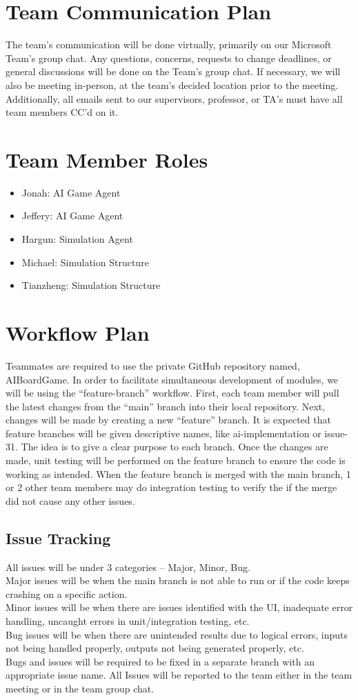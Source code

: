 \documentclass{article}
\begin{document}
\section{Team Communication Plan}
The team’s communication will be done virtually, primarily on our Microsoft Team’s group chat. Any questions, concerns, requests to change deadlines, or general discussions will be done on the Team’s group chat. If necessary, we will also be meeting in-person, at the team’s decided location prior to the meeting. 
Additionally, all emails sent to our supervisors, professor, or TA’s must have all team members CC’d on it.
\section{Team Member Roles}
\begin{itemize}
	\item Jonah: AI Game Agent
	\item Jeffery: AI Game Agent
	\item Hargun: Simulation Agent
	\item Michael: Simulation Structure
	\item Tianzheng: Simulation Structure 
\end{itemize}
\section{Workflow Plan}
Teammates are required to use the private GitHub repository named, AIBoardGame. 
In order to facilitate simultaneous development of modules, we will be using the “feature-branch” workflow. First, each team member will pull the latest changes from the “main” branch into their local repository. 
Next, changes will be made by creating a new “feature” branch. It is expected that feature branches will be given descriptive names, like ai-implementation or issue-31. The idea is to give a clear purpose to each branch. 
Once the changes are made, unit testing will be performed on the feature branch to ensure the code is working as intended. 
When the feature branch is merged with the main branch, 1 or 2 other team members may do integration testing to verify the if the merge did not cause any other issues. 

\subsection{Issue Tracking}
All issues will be under 3 categories – Major, Minor, Bug. 
\\Major issues will be when the main branch is not able to run or if the code keeps crashing on a specific action.
\\Minor issues will be when there are issues identified with the UI, inadequate error handling, uncaught errors in unit/integration testing, etc.
\\Bug issues will be when there are unintended results due to logical errors, inputs not being handled properly, outputs not being generated properly, etc.
\\Bugs and issues will be required to be fixed in a separate branch with an appropriate issue name. All Issues will be reported to the team either in the team meeting or in the team group chat. 
\end{document}
